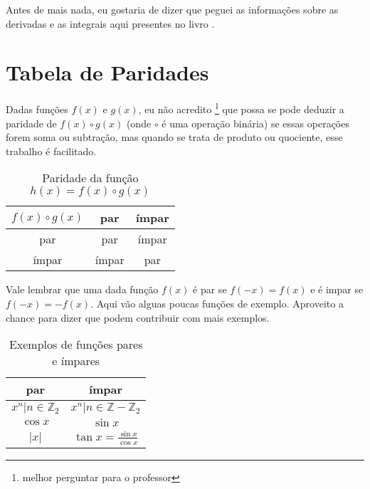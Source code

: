 \documentclass[12pt,openany, letterpaper]{book}
\begin{document}
{{Antes de mais nada, eu gostaria de dizer que peguei as informações sobre as derivadas e as integrais aqui presentes no livro \cite[p.p. 199-201]{referencia}. 

\section*{Tabela de Paridades}

\hspace{5mm}Dadas funções $f(x)$ e $g(x)$, eu não acredito  \footnote{melhor perguntar para o professor} que possa se pode deduzir a paridade de $f(x) \circ g(x)$ (onde $\circ$ é uma operação binária) se essas operações forem soma ou subtração, mas quando se trata de produto ou quociente, esse trabalho é facilitado.

\begin{table}[ht]
\centering
\begin{tabular}{|c|c|c|}
\hline
$f(x) \circ g(x)$ & par & ímpar \\ \hline 
 par &  par & ímpar \\
 ímpar & ímpar & par \\ \hline
\end{tabular}
\caption{Paridade da função $h(x) = f(x) \circ g(x)$}
\label{tab:par1}
\end{table}

Vale lembrar que uma dada função $f(x)$ é par se $f(-x) = f(x)$ e é impar se $f(-x) = - f(x)$. Aqui vão alguas poucas funções de exemplo. Aproveito a chance para dizer que podem contribuir com mais exemplos. 

\begin{table}[ht]
\centering
\begin{tabular}{|c|c|}
\hline
par & ímpar \\ \hline 
 $x^n | n \in \mathds{Z}_2$ &  $x^n | n \in \mathds{Z} - \mathds{Z}_2$ \\
 $\cos x$ & $\sin{x}$\\ 
 $|x|$ & $ \tan x = \frac{\sin x}{\cos x}$ \\ \hline
\end{tabular}
\caption{Exemplos de funções pares e ímpares}
\label{tab:par2}
\end{table}

}}
\end{document}
